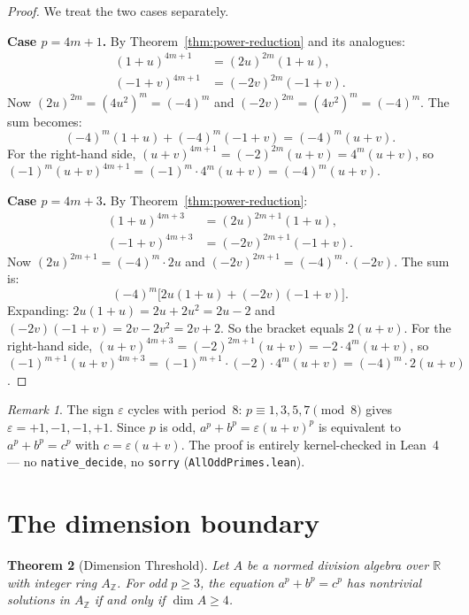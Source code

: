 \documentclass[11pt]{amsart}
\theoremstyle{plain}
\newtheorem{theorem}{Theorem}[section]
\theoremstyle{definition}
\theoremstyle{remark}
\newtheorem{remark}[theorem]{Remark}
\newcommand{\Z}{\mathbb{Z}}
\newcommand{\R}{\mathbb{R}}
\begin{document}
\begin{proof}
We treat the two cases separately.

\medskip\noindent\textbf{Case $p = 4m+1$.}
By Theorem~\ref{thm:power-reduction} and its analogues:
\begin{align*}
  (1+u)^{4m+1} &= (2u)^{2m}(1+u), \\
  (-1+v)^{4m+1} &= (-2v)^{2m}(-1+v).
\end{align*}
Now $(2u)^{2m} = (4u^2)^m = (-4)^m$ and $(-2v)^{2m} = (4v^2)^m = (-4)^m$.
The sum becomes:
\[
  (-4)^m(1+u) + (-4)^m(-1+v) = (-4)^m(u+v).
\]
For the right-hand side, $(u+v)^{4m+1} = (-2)^{2m}(u+v) = 4^m(u+v)$,
so $(-1)^m (u+v)^{4m+1} = (-1)^m \cdot 4^m (u+v) = (-4)^m(u+v)$.

\medskip\noindent\textbf{Case $p = 4m+3$.}
By Theorem~\ref{thm:power-reduction}:
\begin{align*}
  (1+u)^{4m+3} &= (2u)^{2m+1}(1+u), \\
  (-1+v)^{4m+3} &= (-2v)^{2m+1}(-1+v).
\end{align*}
Now $(2u)^{2m+1} = (-4)^m \cdot 2u$ and $(-2v)^{2m+1} = (-4)^m \cdot (-2v)$.
The sum is:
\[
  (-4)^m \bigl[ 2u(1+u) + (-2v)(-1+v) \bigr].
\]
Expanding: $2u(1+u) = 2u + 2u^2 = 2u - 2$ and $(-2v)(-1+v) = 2v - 2v^2 = 2v + 2$.
So the bracket equals $2(u+v)$.
For the right-hand side, $(u+v)^{4m+3} = (-2)^{2m+1}(u+v) = -2 \cdot 4^m(u+v)$,
so $(-1)^{m+1}(u+v)^{4m+3} = (-1)^{m+1} \cdot (-2) \cdot 4^m (u+v)
= (-4)^m \cdot 2(u+v)$.
\end{proof}

\begin{remark}
The sign $\varepsilon$ cycles with period~8:
$p \equiv 1, 3, 5, 7 \pmod{8}$ gives $\varepsilon = +1, -1, -1, +1$.
Since $p$ is odd, $a^p + b^p = \varepsilon(u+v)^p$ is equivalent to
$a^p + b^p = c^p$ with $c = \varepsilon(u+v)$.
The proof is entirely kernel-checked in Lean~4 --- no \texttt{native\_decide},
no \texttt{sorry} (\texttt{AllOddPrimes.lean}).
\end{remark}


\section{The dimension boundary}\label{sec:dim}

\begin{theorem}[Dimension Threshold]\label{thm:dimension}
Let $A$ be a normed division algebra over $\R$ with integer ring $A_\Z$.
For odd $p \geq 3$, the equation $a^p + b^p = c^p$ has nontrivial solutions in $A_\Z$
if and only if $\dim A \geq 4$.
\end{theorem}
\end{document}
